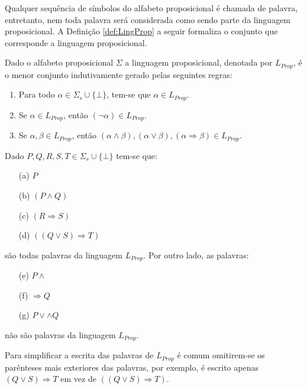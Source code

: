 Qualquer sequência de símbolos do alfabeto proposicional é chamada de palavra, entretanto, nem toda palavra será considerada como sendo parte da linguagem proposicional. A Definição \ref{def:LingProp} a seguir formaliza o conjunto que corresponde a linguagem proposicional.

\begin{definition}\label{def:LingProp}
	Dado o alfabeto proposicional $\Sigma$ a linguagem proposicional, denotada por $L_{Prop}$, é o menor conjunto indutivamente gerado pelas seguintes regras:
	\begin{enumerate}
		\item Para todo $\alpha \in \Sigma_s \cup \{\bot\}$, tem-se que $\alpha \in L_{Prop}$.
		\item Se $\alpha \in L_{Prop}$, então $(\neg\alpha) \in L_{Prop}$.
		\item Se $\alpha, \beta \in L_{Prop}$, então $(\alpha \land \beta), (\alpha \lor \beta), (\alpha \Rightarrow \beta) \in L_{Prop}$. 
	\end{enumerate}
\end{definition}

\begin{example}\label{exe:PalavrasProposicionaisBemFormadas}
	Dado $P, Q, R, S, T \in \Sigma_s \cup \{\bot\}$ tem-se que:
	\begin{itemize}
		\item[(a)] $P$
		\item[(b)] $(P \land Q)$
		\item[(c)] $(R \Rightarrow S)$
		\item[(d)] $((Q \lor S) \Rightarrow T)$
	\end{itemize}
	são todas palavras da linguagem $L_{Prop}$. Por outro lado, as palavras:
	\begin{itemize}
		\item[(e)] $P \land$
		\item[(f)] $\Rightarrow Q$
		\item[(g)] $P \lor \land Q$
	\end{itemize}
	não são palavras da linguagem $L_{Prop}$.
\end{example}

\begin{remark}
	Para simplificar a escrita das palavras de $L_{Prop}$ é comum omitirem-se os parênteses mais exteriores das palavras, por exemplo, é escrito apenas $(Q \lor S) \Rightarrow T$ em vez de $((Q \lor S) \Rightarrow T)$. 
\end{remark}

